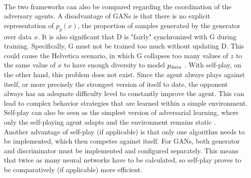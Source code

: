 \\
The two frameworks can also be compared regarding the coordination of the adversary agents. A disadvantage of GANs is that there is no explicit representation of $p_g (x)$, the proportion of samples generated by the generator over data $x$. It is also significant that D is "fairly" synchronized with G during training.
Specifically, G must not be trained too much without updating D. This could cause the Helvetica scenario, in which G collapses too many values of $z$ to the same value of $x$ to have enough diversity to model $p\textsubscript{data}$ \cite{gansgoodfellow2014generative}.
With self-play, on the other hand, this problem does not exist. Since the agent always plays against itself, or more precisely the strongest version of itself to date, the opponent always has an adequate difficulty level to constantly improve the agent. This can lead to complex behavior strategies that are learned within a simple environment. Self-play can also be seen as the simplest version of adversarial learning, where only the self-playing agent adapts and the environment remains static \cite{gabor19}.
\\
Another advantage of self-play (if applicable) is that only one algorithm needs to be implemented, which then competes against itself. For GANs, both generator and discriminator must be implemented and configured separately. This means that twice as many neural networks have to be calculated, so self-play proves to be comparatively (if applicable) more efficient.